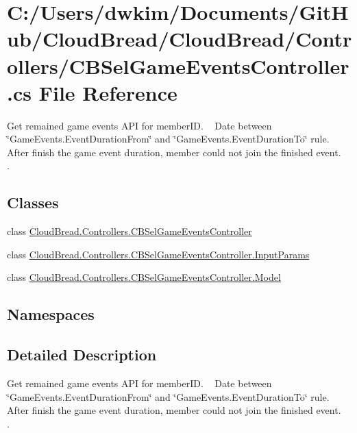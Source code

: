 \hypertarget{a00217}{}\section{C\+:/\+Users/dwkim/\+Documents/\+Git\+Hub/\+Cloud\+Bread/\+Cloud\+Bread/\+Controllers/\+C\+B\+Sel\+Game\+Events\+Controller.cs File Reference}
\label{a00217}


Get remained game events A\+PI for member\+ID. ~\newline
Date between \char`\"{}\+Game\+Events.\+Event\+Duration\+From\char`\"{} and \char`\"{}\+Game\+Events.\+Event\+Duration\+To\char`\"{} rule. ~\newline
After finish the game event duration, member could not join the finished event. ~\newline
.  


\subsection*{Classes}
\begin{DoxyCompactItemize}
\item 
class \hyperlink{a00046}{Cloud\+Bread.\+Controllers.\+C\+B\+Sel\+Game\+Events\+Controller}
\item 
class \hyperlink{a00119}{Cloud\+Bread.\+Controllers.\+C\+B\+Sel\+Game\+Events\+Controller.\+Input\+Params}
\item 
class \hyperlink{a00166}{Cloud\+Bread.\+Controllers.\+C\+B\+Sel\+Game\+Events\+Controller.\+Model}
\end{DoxyCompactItemize}
\subsection*{Namespaces}
\begin{DoxyCompactItemize}
\end{DoxyCompactItemize}


\subsection{Detailed Description}
Get remained game events A\+PI for member\+ID. ~\newline
Date between \char`\"{}\+Game\+Events.\+Event\+Duration\+From\char`\"{} and \char`\"{}\+Game\+Events.\+Event\+Duration\+To\char`\"{} rule. ~\newline
After finish the game event duration, member could not join the finished event. ~\newline
. 

